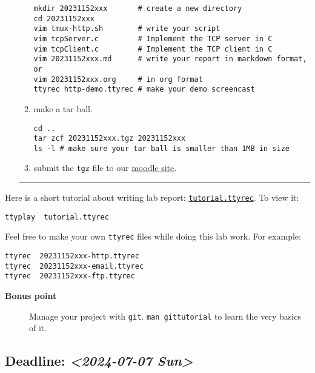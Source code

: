 \documentclass{article}
\begin{document}
\begin{itemize}
\begin{enumerate}
\begin{verbatim}
mkdir 20231152xxx       # create a new directory
cd 20231152xxx
vim tmux-http.sh        # write your script
vim tcpServer.c         # Implement the TCP server in C
vim tcpClient.c         # Implement the TCP client in C
vim 20231152xxx.md      # write your report in markdown format, or
vim 20231152xxx.org     # in org format
ttyrec http-demo.ttyrec # make your demo screencast
\end{verbatim}

\item make a tar ball.
\begin{verbatim}
cd ..                                                      
tar zcf 20231152xxx.tgz 20231152xxx                        
ls -l # make sure your tar ball is smaller than 1MB in size
\end{verbatim}

\item submit the \texttt{tgz} file to our \href{https://cs6.swfu.edu.cn/moodle/mod/assign/view.php?id=760}{moodle site}.
\end{enumerate}

\noindent\rule{\textwidth}{0.5pt}
\end{itemize}

Here is a short tutorial about writing lab report: \href{tutorial.ttyrec}{\texttt{tutorial.ttyrec}}. To view it:

\begin{verbatim}
ttyplay  tutorial.ttyrec
\end{verbatim}

Feel free to make your own \texttt{ttyrec} files while doing this lab work. For example:

\begin{verbatim}
ttyrec  20231152xxx-http.ttyrec
ttyrec  20231152xxx-email.ttyrec
ttyrec  20231152xxx-ftp.ttyrec
\end{verbatim}

\begin{description}
\item[{\textbf{Bonus point}}] Manage your project with \texttt{git}. \texttt{man gittutorial} to
learn the very basics of it.
\end{description}

\subsection{Deadline: \textit{<2024-07-07 Sun>}}
\label{sec:org4f38793}
\end{document}
